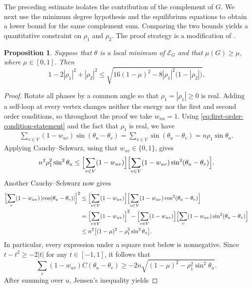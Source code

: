 \documentclass[reqno,11pt]{amsart}
\newtheorem{proposition}{Proposition}
\theoremstyle{definition}
\newcommand{\abs}[1]{\left\lvert #1\right\rvert}
\begin{document}
The preceding estimate isolates the contribution of the complement of
$G$.  We next use the minimum degree hypothesis and the equilibrium equations to obtain a lower bound for the same complement sum.  Comparing the two bounds yields a quantitative constraint on $\rho_1$ and $\rho_2$. The proof strategy is a modification of \cite[Lemma~1]{kassabov-strogatz-townsend-dense}.

\begin{proposition}\label{prop:main-rho1-rho2-bound}
Suppose that $\theta$ is a local minimum of $\mathcal E_G$ and that
$\mu(G)\ge\mu$, where $\mu\in[0,1]$.  Then
\[
1-2\abs{\rho_1}^2+\abs{\rho_2}^2
\le \sqrt{16(1-\mu)^2
       -8\abs{\rho_1}^2
        \bigl(1-\abs{\rho_2}\bigr)}.
\]
\end{proposition}

\begin{proof}
Rotate all phases by a common angle so that
$\rho_1=\abs{\rho_1}\ge0$ is real.  Adding a self-loop at every vertex changes neither
the energy nor the first and second order conditions, so throughout the
proof we take $w_{uu}=1$.  Using
\eqref{eq:first-order-condition-statement} and the fact that $\rho_1$
is real, we have
\begin{align*}
\sum_{v\in V}(1- w_{uv})\sin(\theta_u-\theta_v)=\sum_{v\in V}\sin(\theta_u-\theta_v) =n \rho_1 \sin\theta_u.
\end{align*}
Applying Cauchy--Schwarz, using that $w_{uv} \in \{0, 1\}$, gives
\begin{equation*}
    n^2\rho_1^2\sin^2\theta_u\le \Bigl[\sum_{v\in V}(1- w_{uv})\Bigr]\Bigl[\sum_{v\in V} (1- w_{uv}) \sin^2(\theta_u-\theta_v)\Bigr].
\end{equation*}
Another Cauchy--Schwarz now gives 
\begin{align*}
\Bigl[\sum_v(1- w_{uv})
       \abs{\cos(\theta_u-\theta_v)}\Bigr]^2
&\le \Bigl[\sum_{v\in V}(1- w_{uv})\Bigr]\Bigl[\sum_{v\in V} (1-w_{uv}) \cos^2(\theta_u-\theta_v)\Bigr]\\
&=\Bigl[\sum_{v\in V}(1- w_{uv})\Bigr]^2-\Bigl[\sum_{v\in V}(1- w_{uv})\Bigr]\Bigl[\sum_v (1- w_{uv})
       \sin^2(\theta_u-\theta_v)\Bigr]\\
&\le n^2\bigl[(1-\mu)^2-\rho_1^2\sin^2\theta_u\bigr].
\end{align*}
In particular, every expression under a square root below is
nonnegative.  Since $t-t^2\ge-2\abs{t}$ for any $t\in[-1,1]$, it follows that
\[
\sum_v (1-w_{uv}) C(\theta_u-\theta_v)
\ge-2n\sqrt{(1-\mu)^2-\rho_1^2\sin^2\theta_u}.
\]
After summing over $u$, Jensen's inequality yields

\end{proof}
\end{document}
